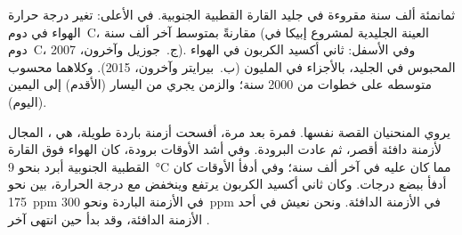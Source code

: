 \begin{omfigure}

{\small ثمانمئة ألف سنة مقروءة في جليد القارة القطبية الجنوبية. في الأعلى: تغير
درجة حرارة الهواء في دوم~C، مقارنةً بمتوسط آخر ألف سنة (العينة الجليدية لمشروع
إبيكا في دوم~C، ج.~جوزيل وآخرون، 2007). وفي الأسفل: ثاني أكسيد الكربون في الهواء
المحبوس في الجليد، بالأجزاء في المليون (ب.~بيرايتر وآخرون، 2015). وكلاهما محسوب
متوسطه على خطوات من \num{2000} سنة؛ والزمن يجري من اليسار (الأقدم) إلى اليمين
(اليوم).}
\label{fig:g9:climate-past-and-present:icecore}
\end{omfigure}

يروي المنحنيان القصة نفسها. فمرة بعد مرة، أفسحت أزمنة باردة طويلة، هي ، المجال لأزمنة دافئة أقصر، ثم عادت البرودة. وفي أشد الأوقات برودة، كان
الهواء فوق القارة القطبية الجنوبية أبرد بنحو \qty{9}{\degreeCelsius} مما كان
عليه في آخر ألف سنة؛ وفي أدفأ الأوقات كان أدفأ ببضع درجات. وكان ثاني أكسيد الكربون
يرتفع وينخفض مع درجة الحرارة، بين نحو \qty{175}{ppm} في الأزمنة الباردة ونحو
\qty{300}{ppm} في الأزمنة الدافئة. ونحن نعيش في أحد الأزمنة الدافئة، وقد بدأ حين
انتهى آخر .

